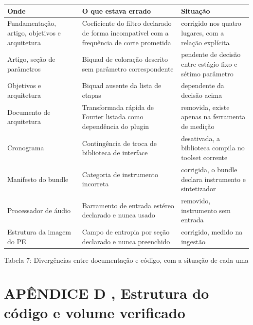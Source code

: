 \documentclass[12pt,a4paper]{article}
\begin{document}
\begin{center}
\footnotesize
\setlength{\tabcolsep}{4pt}
\begin{tabular}{p{}|p{}|p{}}
\hline
\textbf{Onde} & \textbf{O que estava errado} & \textbf{Situação} \\
\hline
Fundamentação, artigo, objetivos e arquitetura & Coeficiente do filtro declarado de forma incompatível com a frequência de corte prometida & corrigido nos quatro lugares, com a relação explícita \\
Artigo, seção de parâmetros & Biquad de coloração descrito sem parâmetro correspondente & pendente de decisão entre estágio fixo e sétimo parâmetro \\
Objetivos e arquitetura & Biquad ausente da lista de etapas & dependente da decisão acima \\
Documento de arquitetura & Transformada rápida de Fourier listada como dependência do plugin & removida, existe apenas na ferramenta de medição \\
Cronograma & Contingência de troca de biblioteca de interface & desativada, a biblioteca compila no toolset corrente \\
Manifesto do bundle & Categoria de instrumento incorreta & corrigida, o bundle declara instrumento e sintetizador \\
Processador de áudio & Barramento de entrada estéreo declarado e nunca usado & removido, instrumento sem entrada \\
Estrutura da imagem do PE & Campo de entropia por seção declarado e nunca preenchido & corrigido, medido na ingestão \\
\hline
\end{tabular}
\end{center}
\noindent Tabela 7: Divergências entre documentação e código, com a situação de cada uma\par
\label{tab:7}
\vspace{2pt}{\footnotesize\noindent Elaborado pelos autores (2026).\par}

\section*{APÊNDICE D ,  Estrutura do código e volume verificado}
\end{document}
